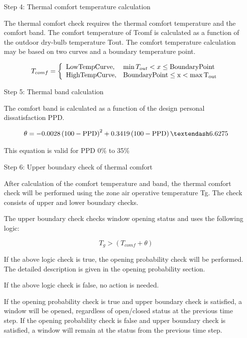 Step 4: Thermal comfort temperature calculation

The thermal comfort check requires the thermal comfort temperature and the comfort band. The comfort temperature of Tcomf is calculated as a function of the outdoor dry-bulb temperature Tout. The comfort temperature calculation may be based on two curves and a boundary temperature point.

\begin{equation}
T_{comf} = \left\{ \begin{array}{ll} \rm{Low Temp Curve,} & \min T_{out} < x \leq \rm{Boundary Point} \\ \rm{High Temp Curve,} & \rm{Boundary Point} \leq x < \max T_{out}  \end{array}\right.
\end{equation}

Step 5: Thermal band calculation

The comfort band is calculated as a function of the design personal dissatisfaction PPD.

\begin{equation}
\theta = -0.0028 \left(100-\rm{PPD}\right)^2 + 0.3419 \left(100-\rm{PPD}\right) – 6.6275
\end{equation}

This equation is valid for PPD 0\% to 35\%

Step 6: Upper boundary check of thermal comfort

After calculation of the comfort temperature and band, the thermal comfort check will be performed using the zone air operative temperature Tg. The check consists of upper and lower boundary checks.

The upper boundary check checks window opening status and uses the following logic:

\begin{equation}
T_g > \left(T_{comf} + \theta\right)
\end{equation}

If the above logic check is true, the opening probability check will be performed. The detailed description is given in the opening probability section.

If the above logic check is false, no action is needed.

If the opening probability check is true and upper boundary check is satisfied, a window will be opened, regardless of open/closed status at the previous time step. If the opening probability check is false and upper boundary check is satisfied, a window will remain at the status from the previous time step.

